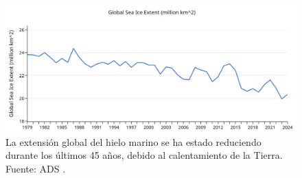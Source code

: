 \documentclass[10pt,twocolumn,letterpaper]{article}
\begin{document}
\begin{figure}[t]
\begin{center}
\includegraphics[width=1\textwidth]{ice.jpg}
\end{center}
   \caption{La extensión global del hielo marino se ha estado reduciendo durante los últimos 45 años, debido al calentamiento de la Tierra. Fuente: ADS \cite{149}.}
\label{fig:24}
\end{figure}

\clearpage
\twocolumn

{\small
\renewcommand{\refname}{References}


}
\end{document}
